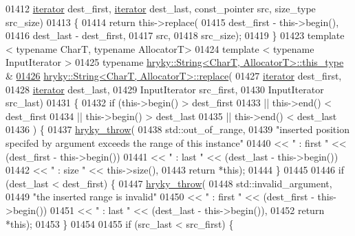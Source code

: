 \begin{DoxyCode}
01412     \hyperlink{classhryky_1_1iterator_1_1random_1_1_mutable}{iterator} dest\_first, \hyperlink{classhryky_1_1iterator_1_1random_1_1_mutable}{iterator} dest\_last, const\_pointer src, size\_type 
      src\_size)
01413 \{
01414     \textcolor{keywordflow}{return} this->replace(
01415         dest\_first - this->begin(),
01416         dest\_last - dest\_first,
01417         src,
01418         src\_size);
01419 \}
01423 \textcolor{keyword}{template} < \textcolor{keyword}{typename} CharT, \textcolor{keyword}{typename} AllocatorT>
01424 \textcolor{keyword}{template} < \textcolor{keyword}{typename} InputIterator >
01425 \textcolor{keyword}{typename} \hyperlink{classhryky_1_1_string}{hryky::String<CharT, AllocatorT>::this_type} &
\hypertarget{string_8h_source_l01426}{}\hyperlink{classhryky_1_1_string_a8f29b486917c6e7913120be286c74c4d}{01426} \hyperlink{classhryky_1_1_string}{hryky::String<CharT, AllocatorT>::replace}(
01427     \hyperlink{classhryky_1_1iterator_1_1random_1_1_mutable}{iterator} dest\_first,
01428     \hyperlink{classhryky_1_1iterator_1_1random_1_1_mutable}{iterator} dest\_last,
01429     InputIterator src\_first,
01430     InputIterator src\_last)
01431 \{
01432     \textcolor{keywordflow}{if} (this->begin() > dest\_first
01433          || this->end() < dest\_first
01434          || this->begin() > dest\_last
01435          || this->end() < dest\_last
01436          ) \{
01437         \hyperlink{debug__common_8h_af50606eac4009921527ddcaed392b2c2}{hryky_throw}(
01438             std::out\_of\_range,
01439             \textcolor{stringliteral}{"inserted position specifed by argument exceeds the range of this
       instance"}
01440             << \textcolor{stringliteral}{" : first "} << (dest\_first - this->begin())
01441             << \textcolor{stringliteral}{" : last "} << (dest\_last - this->begin())
01442             << \textcolor{stringliteral}{" : size "} << this->size(),
01443             \textcolor{keywordflow}{return} *\textcolor{keyword}{this});
01444     \}
01445 
01446     \textcolor{keywordflow}{if} (dest\_last < dest\_first) \{
01447         \hyperlink{debug__common_8h_af50606eac4009921527ddcaed392b2c2}{hryky_throw}(
01448             std::invalid\_argument,
01449             \textcolor{stringliteral}{"the inserted range is invalid"}
01450             << \textcolor{stringliteral}{" : first "} << (dest\_first - this->begin())
01451             << \textcolor{stringliteral}{" : last "} << (dest\_last - this->begin()),
01452             \textcolor{keywordflow}{return} *\textcolor{keyword}{this});
01453     \}
01454 
01455     \textcolor{keywordflow}{if} (src\_last < src\_first) \{

\end{DoxyCode}
